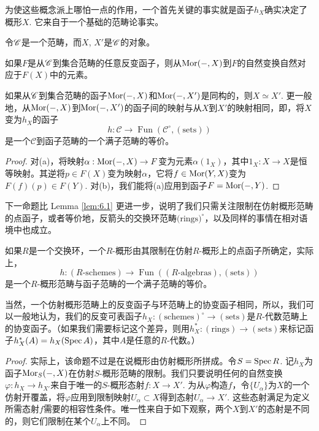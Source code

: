 为使这些概念派上哪怕一点的作用，一个首先关键的事实就是函子$h_X$确实决定了概形$X$. 它来自于一个基础的范畴论事实。

\begin{lem}[Yoneda引理]\label{lem:6.1}
令$\mathscr{C}$是一个范畴，而$X$, $X'$是$\mathscr{C}$的对象。
\begin{compactenum}[(\rm a)]
\item 如果$F$是从$\mathscr{C}$到集合范畴的任意反变函子，则从$\operatorname{Mor}(-,X)$到$F$的自然变换自然对应于$F(X)$中的元素。
\item 如果从$\mathscr{C}$到集合范畴的函子$\operatorname{Mor}(-,X)$和$\operatorname{Mor}(-,X')$是同构的，则$X\simeq X'$. 更一般地，从$\operatorname{Mor}(-,X)$到$\operatorname{Mor}(-,X')$的函子间的映射与从$X$到$X'$的映射相同，即，将$X$变为$h_X$的函子
\[
	h:\mathscr C\to \operatorname{Fun}(\mathscr C^\circ,(\text{sets}))
\]
是一个$\mathscr C$到函子范畴的一个满子范畴的等价。
\end{compactenum}
\end{lem}

\begin{proof}
对(a)，将映射$\alpha:\operatorname{Mor}(-,X)\to F$变为元素$\alpha(1_X)$，其中$1_X:X\to X$是恒等映射。其逆将$p\in F(X)$变为映射$\alpha$，它将$f\in \operatorname{Mor}(Y,X)$变为$F(f)(p)\in F(Y)$. 对(b)，我们能将(a)应用到函子$F=\operatorname{Mor}(-,Y)$.
\end{proof}

下一命题比 Lemma \ref{lem:6.1} 更进一步，说明了我们只需关注限制在仿射概形范畴的点函子，或者等价地，反箭头的交换环范畴$\text{(rings)}^\circ$，以及同样的事情在相对语境中也成立。

\begin{pro}\label{pro:6.2}
如果$R$是一个交换环，一个$R$-概形由其限制在仿射$R$-概形上的点函子所确定，实际上，
\[
	h:(\text{$R$-schemes})\to \operatorname{Fun}((\text{$R$-algebras}),(\text{sets}))
\]
是一个$R$-概形范畴与函子范畴的一个满子范畴的等价。
\end{pro}

当然，一个仿射概形范畴上的反变函子与环范畴上的协变函子相同，所以，我们可以一般地认为，我们的反变可表函子$h_X:(\text{schemes})^\circ \to (\text{sets})$是$R$-代数范畴上的协变函子。（如果我们需要标记这个差异，则用$h_X^*:(\text{rings})\to (\text{sets})$来标记函子$h_X^*(A)=h_X(\operatorname{Spec} A)$，其中$A$是任意的$R$-代数。）

\begin{proof}
实际上，该命题不过是在说概形由仿射概形所拼成。令$S=\operatorname{Spec} R$. 记$h_X$为函子$\operatorname{Mor}_S(-,X)$在仿射$S$-概形范畴的限制。我们只要说明任何的自然变换$\varphi:h_X\to h_{X'}$来自于唯一的$S$-概形态射$f:X\to X'$. 为从$\varphi$构造$f$，令$\{U_\alpha\}$为$X$的一个仿射开覆盖，将$\varphi$应用到限制映射$U_\alpha\subset X$得到态射$U_\alpha\to X'$. 这些态射满足为定义所需态射$f$需要的相容性条件。唯一性来自于如下观察，两个$X$到$X'$的态射是不同的，则它们限制在某个$U_\alpha$上不同。
\end{proof}

